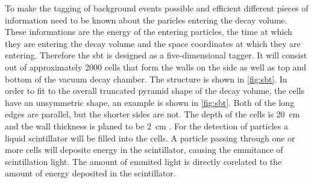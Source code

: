 To make the tagging of background events possible and efficient different pieces of information need to be known about the paricles entering the decay volume.
These informations are the energy of the entering particles, the time at which they are entering the decay volume and the space coordinates at which they are entering.
Therefore the \ac{sbt} is designed as a five-dimensional tagger.
It will consist out of approximately 2000 cells that form the walls on the side as well as top and bottom of the vacuum decay chamber.
The structure is shown in \autoref{fig:sbt}.
In order to fit to the overall truncated pyramid shape of the decay volume, the cells have an unsymmetric shape, an example is shown in \autoref{fig:sbt}.
Both of the long edges are parallel, but the shorter sides are not.
The depth of the cells is \SI{20}{\centi\meter} and the wall thickness is planed to be \SI{2}{\centi\meter} \cite{}.
For the detection of particles a liquid scintillator will be filled into the cells.
A particle passing through one or more cells will deposite energy in the scintillator, causing the emmitance of scintillation light.
The amount of emmited light is directly corelated to the amount of energy deposited in the scintillator.
